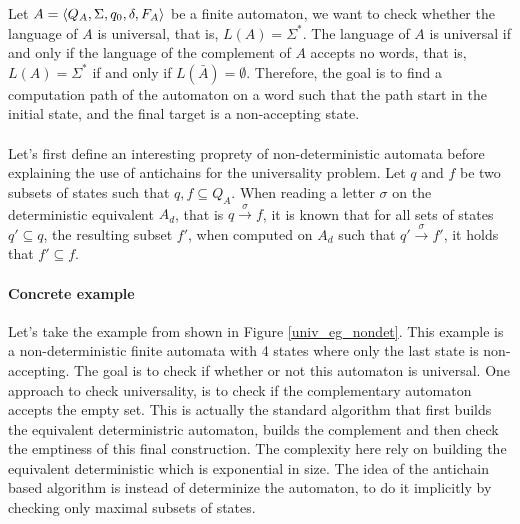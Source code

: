 \documentclass[letterpaper]{article}
\DeclarePairedDelimiter{\tuple}{\langle}{\rangle}
\theoremstyle{definition}
\begin{document}
Let $A = \tuple{Q_A, \Sigma, q_0, \delta, F_A}$ be a finite automaton,
we want to check whether
the language of $A$ is universal, that is, $L(A) = \Sigma^*$.
The language of $A$ is universal if and only if the language
of the complement of $A$ accepts no words, that is,
$L(A) = \Sigma^*$ if and only if $L(\bar{A}) = \emptyset$.
Therefore, the goal is to find a computation path of the
automaton on a word such that the path start in the initial state,
and the final target is a non-accepting state.

\paragraph{}

Let's first define an interesting proprety of non-deterministic automata
before explaining the use of antichains for the universality problem.
Let $q$ and $f$ be two subsets of states such that $q, f \subseteq Q_A$.
When reading a letter $\sigma$ on the deterministic equivalent
$A_d$, that is $q \xrightarrow{\sigma} f$, it is known that
for all sets of states $q' \subseteq q$, the resulting subset
$f'$, when computed on $A_d$ such that $q' \xrightarrow{\sigma} f'$,
it holds that $f' \subseteq f$.

\paragraph{Concrete example}

Let's take the example from \cite{AC_universality}
shown in Figure \ref{univ_eg_nondet}. This example is a
non-deterministic finite automata with 4 states where
only the last state is non-accepting.
The goal is to check
if whether or not this automaton is universal.
One approach to check universality, is to check if the
complementary automaton accepts the empty set.
This is actually the standard algorithm that first builds
the equivalent deterministric automaton, builds the complement
and then check the emptiness of this final construction.
The complexity here rely on building the equivalent deterministic
which is exponential in size. The idea of the antichain based
algorithm is instead of determinize the automaton, to
do it implicitly by checking only maximal subsets of states.

\paragraph{}
\end{document}
